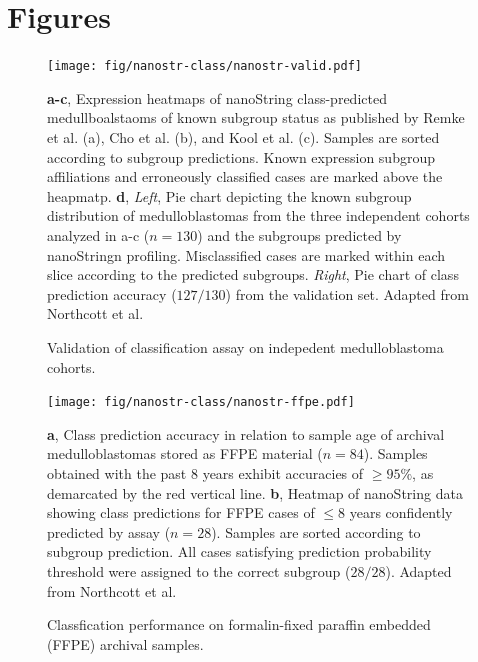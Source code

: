 \documentclass[11pt,letterpaper]{article}
\theoremstyle{definition}
\begin{document}
\section{Figures}

\begin{figure}[h]
	\begin{center}
		\texttt{[image: fig/nanostr-class/nanostr-valid.pdf]}
	\end{center}
	\caption{Validation of classification assay on indepedent medulloblastoma cohorts.}
	\textbf{a-c}, Expression heatmaps of nanoString class-predicted medullboalstaoms of known subgroup status as published by Remke et al. (a), Cho et al. (b), and Kool et al. (c). Samples are sorted according to subgroup predictions. Known expression subgroup affiliations and erroneously classified cases are marked above the heapmatp. \textbf{d}, \emph{Left}, Pie chart depicting the known subgroup distribution of medulloblastomas from the three independent cohorts analyzed in a-c ($n = 130$) and the subgroups predicted by nanoStringn profiling. Misclassified cases are marked within each slice according to the predicted subgroups. \emph{Right}, Pie chart of class prediction accuracy ($127/130$) from the validation set. Adapted from Northcott et al.
	\label{fig:nanostr-valid}
\end{figure}

\begin{figure}[h]
	\begin{center}
		\texttt{[image: fig/nanostr-class/nanostr-ffpe.pdf]}
	\end{center}
	\caption{Classfication performance on formalin-fixed paraffin embedded (FFPE) archival samples.}
	\textbf{a}, Class prediction accuracy in relation to sample age of archival medulloblastomas stored as FFPE material ($n = 84$). Samples obtained with the past 8 years exhibit accuracies of $\geq 95\%$, as demarcated by the red vertical line. \textbf{b}, Heatmap of nanoString data showing class predictions for FFPE cases of $\leq 8$ years confidently predicted by assay ($n = 28$). Samples are sorted according to subgroup prediction. All cases satisfying prediction probability threshold were assigned to the correct subgroup ($28/28$). Adapted from Northcott et al.
	\label{fig:nanostr-ffpe}
\end{figure}

\clearpage
\end{document}
